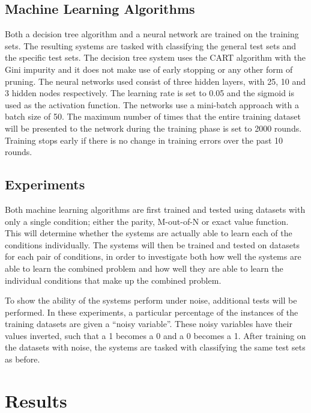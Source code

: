 \documentclass[letterpaper]{article} %
\begin{document}
\subsection{Machine Learning Algorithms}
Both a decision tree algorithm and a neural network are trained on the training sets. The resulting systems are tasked with classifying the general test sets and the specific test sets. The decision tree system uses the CART algorithm \cite{breiman1984classification} with the Gini impurity and it does not make use of early stopping or any other form of pruning. The neural networks used consist of three hidden layers, with 25, 10 and 3 hidden nodes respectively. The learning rate is set to 0.05 and the sigmoid is used as the activation function. The networks use a mini-batch approach with a batch size of 50. The maximum number of times that the entire training dataset will be presented to the network during the training phase is set to 2000 rounds. Training stops early if there is no change in training errors over the past 10 rounds.


\subsection{Experiments}
Both machine learning algorithms are first trained and tested using datasets with only a single condition; either the parity, M-out-of-N or exact value function. This will determine whether the systems are actually able to learn each of the conditions individually. The systems will then be trained and tested on datasets for each pair of conditions, in order to investigate both how well the systems are able to learn the combined problem and how well they are able to learn the individual conditions that make up the combined problem. 

To show the ability of the systems perform under noise, additional tests will be performed. In these experiments, a particular percentage of the instances of the training datasets are given a ``noisy variable''. These noisy variables have their values inverted, such that a 1 becomes a 0 and a 0 becomes a 1. After training on the datasets with noise, the systems are tasked with classifying the same test sets as before. 

\section{Results}
\end{document}
